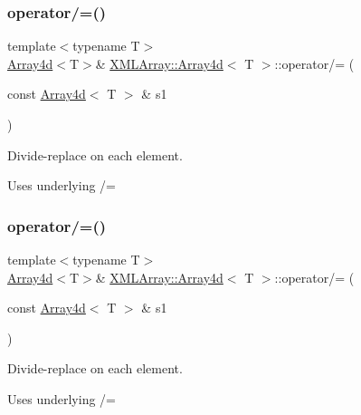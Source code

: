 \subsubsection{\texorpdfstring{operator/=()}{operator/=()}\hspace{0.1cm}{\footnotesize\ttfamily [2/6]}}
{\footnotesize\ttfamily template$<$typename T$>$ \\
\mbox{\hyperlink{classXMLArray_1_1Array4d}{Array4d}}$<$T$>$\& \mbox{\hyperlink{classXMLArray_1_1Array4d}{X\+M\+L\+Array\+::\+Array4d}}$<$ T $>$\+::operator/= (\begin{DoxyParamCaption}\item[{const \mbox{\hyperlink{classXMLArray_1_1Array4d}{Array4d}}$<$ T $>$ \&}]{s1 }\end{DoxyParamCaption})\hspace{0.3cm}{\ttfamily [inline]}}



Divide-\/replace on each element. 

Uses underlying /= \mbox{\label{classXMLArray_1_1Array4d_ac8d0ba2bc4f085bf48baf6530db0cfcb}} 
\subsubsection{\texorpdfstring{operator/=()}{operator/=()}\hspace{0.1cm}{\footnotesize\ttfamily [3/6]}}
{\footnotesize\ttfamily template$<$typename T$>$ \\
\mbox{\hyperlink{classXMLArray_1_1Array4d}{Array4d}}$<$T$>$\& \mbox{\hyperlink{classXMLArray_1_1Array4d}{X\+M\+L\+Array\+::\+Array4d}}$<$ T $>$\+::operator/= (\begin{DoxyParamCaption}\item[{const \mbox{\hyperlink{classXMLArray_1_1Array4d}{Array4d}}$<$ T $>$ \&}]{s1 }\end{DoxyParamCaption})\hspace{0.3cm}{\ttfamily [inline]}}



Divide-\/replace on each element. 

Uses underlying /= \mbox{\label{classXMLArray_1_1Array4d_a22b262f7b7905313ae8e21d5e2d717a7}} 
